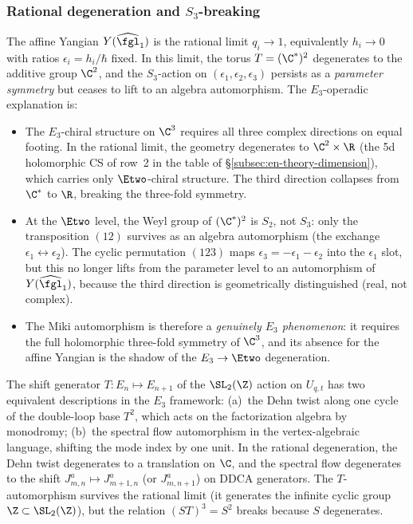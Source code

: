 \subsubsection{Rational degeneration and \texorpdfstring{$S_3$}{S-3}-breaking}
\label{subsubsec:miki-degeneration}

The affine Yangian $Y(\widehat{\fgl}_1)$ is the rational limit $q_i \to 1$, equivalently $h_i \to 0$ with ratios $\epsilon_i = h_i/\hbar$ fixed. In this limit, the torus $T = (\C^*)^2$ degenerates to the additive group $\C^2$, and the $S_3$-action on $(\epsilon_1, \epsilon_2, \epsilon_3)$ persists as a \emph{parameter symmetry} but ceases to lift to an algebra automorphism. The $E_3$-operadic explanation is:
\begin{itemize}
 \item The $E_3$-chiral structure on $\C^3$ requires all three complex directions on equal footing. In the rational limit, the geometry degenerates to $\C^2 \times \R$ (the 5d holomorphic CS of row~2 in the table of \S\ref{subsec:en-theory-dimension}), which carries only $\Etwo$-chiral structure. The third direction collapses from $\C^*$ to $\R$, breaking the three-fold symmetry.
 \item At the $\Etwo$ level, the Weyl group of $(\C^*)^2$ is $S_2$, not $S_3$: only the transposition $(12)$ survives as an algebra automorphism (the exchange $\epsilon_1 \leftrightarrow \epsilon_2$). The cyclic permutation $(123)$ maps $\epsilon_3 = -\epsilon_1 - \epsilon_2$ into the $\epsilon_1$ slot, but this no longer lifts from the parameter level to an automorphism of $Y(\widehat{\fgl}_1)$, because the third direction is geometrically distinguished (real, not complex).
 \item The Miki automorphism is therefore a \emph{genuinely $E_3$ phenomenon}: it requires the full holomorphic three-fold symmetry of $\C^3$, and its absence for the affine Yangian is the shadow of the $E_3 \to \Etwo$ degeneration.
\end{itemize}

\begin{remark}
\label{rem:T-generator-dehn}
The shift generator $T \colon E_n \mapsto E_{n+1}$ of the $\SL_2(\Z)$ action on $U_{q,t}$ has two equivalent descriptions in the $E_3$ framework: (a)~the Dehn twist along one cycle of the double-loop base $T^2$, which acts on the factorization algebra by monodromy; (b)~the spectral flow automorphism in the vertex-algebraic language, shifting the mode index by one unit. In the rational degeneration, the Dehn twist degenerates to a translation on $\C$, and the spectral flow degenerates to the shift $J^a_{m,n} \mapsto J^a_{m+1,n}$ (or $J^a_{m,n+1}$) on DDCA generators. The $T$-automorphism survives the rational limit (it generates the infinite cyclic group $\Z \subset \SL_2(\Z)$), but the relation $(ST)^3 = S^2$ breaks because $S$ degenerates.
\end{remark}

